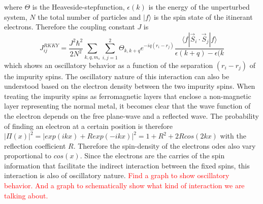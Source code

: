 where $\Theta$ is the Heaveside-stepfunction, $\epsilon(k)$ is the energy of the unperturbed system, $N$ the total number of particles and $|f\rangle$ is the spin state of the itinerant electrons. \newline
Therefore the coupling constant $J$ is
\begin{equation} \label{eq:J_general}
    J_{ij}^{RKKY} = \frac{J^2\hbar^2}{2N^2} \sum_{k,q,m_s} \sum_{i,j=1}^2 \Theta_{k,k+q} e^{-iq(r_i-r_j)} \frac{\langle f|\Vec{S}_i \cdot \Vec{S}_j|f\rangle}{\epsilon(k+q)- \epsilon(k}
\end{equation}
which shows an oscillatory behavior as a function of the separation $(r_i-r_j)$ of the impurity spins. \newline
The oscillatory nature of this interaction can also be understood based on the electron density between the two impurity spins.
When treating the impurity spins as ferromagnetic layers that enclose a non-magnetic layer representing the normal metal, it becomes clear that the wave function of the electron depends on the free plane-wave and a reflected wave.
The probability of finding an electron at a certain position is therefore $|\Pi(x)|^2 = |exp(ikx) +R exp(-ikx)|^2 = 1 + R^2 + 2Rcos(2kx)$ with the reflection coefficient $R$.
Therefore the spin-density of the electrons odes also vary proportional to $cos(x)$.
Since the electrons are the carries of the spin information that facilitate the indirect interaction between the fixed spins, this interaction is also of oscillatory nature. \newline
\textcolor{red}{Find a graph to show oscillatory behavior. And a graph to schematically show what kind of interaction we are talking about.}

